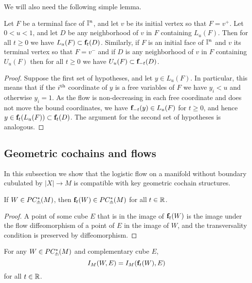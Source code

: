 We will also need the following simple lemma.

\begin{lemma}\label{L:domain flow}
	Let $F$ be a terminal face of $\mathbb{I}^n$, and let $v$ be its initial vertex so that $F=v^+$.
	Let $0<u<1$, and let $D$ be any neighborhood of $v$ in $F$ containing $L_u(F)$.
	Then for all $t\geq 0$ we have $L_u(F)\subset \mathbf{f}_t(D)$.
	Similarly, if $F$ is an initial face of $\mathbb{I}^n$ and $v$ its terminal vertex so that $F=v^-$ and if $D$ is any neighborhood of $v$ in $F$ containing $U_u(F)$ then for all $t\geq 0$ we have $U_u(F)\subset \mathbf{f}_{-t}(D)$.
\end{lemma}

\begin{proof}
	Suppose the first set of hypotheses, and let $y \in L_u(F)$.
	In particular, this means that if the $i^{\mathrm{th}}$ coordinate of $y$ is a free variables of $F$ we have $y_i < u$ and otherwise $y_i = 1$.
	As the flow is non-decreasing in each free coordinate and does not move the bound coordinates, we have $\mathbf{f}_{-t}(y)\in L_u(F)$ for $t\geq 0$, and hence $y \in \mathbf{f}_t(L_u(F)) \subset \mathbf{f}_t(D)$.
	The argument for the second set of hypotheses is analogous.
\end{proof}

\subsection{Geometric cochains and flows}

In this subsection we show that the logistic flow on a manifold without boundary cubulated by $|X| \to M$ is compatible with key geometric cochain structures.

\begin{lemma}\label{L:flow preserves transversality}
	If $W \in PC_{\pitchfork}^*(M)$, then $\mathbf{f}_t(W)\in PC_{\pitchfork}^*(M)$ for all $t \in \mathbb{R}$.
\end{lemma}

\begin{proof}
	A point of some cube $E$ that is in the image of $\mathbf{f}_t(W)$ is the image under the flow diffeomorphism of a point of $E$ in the image of $W$, and the transversality condition is preserved by diffeomorphism.
\end{proof}

\begin{lemma}
	For any $W \in PC_{\pitchfork}^*(M)$ and complementary cube $E$,
	\begin{equation*}
		I_M(W, E) = I_M(\mathbf{f}_t(W), E)
	\end{equation*}
	for all $t \in \mathbb{R}$.
\end{lemma}

